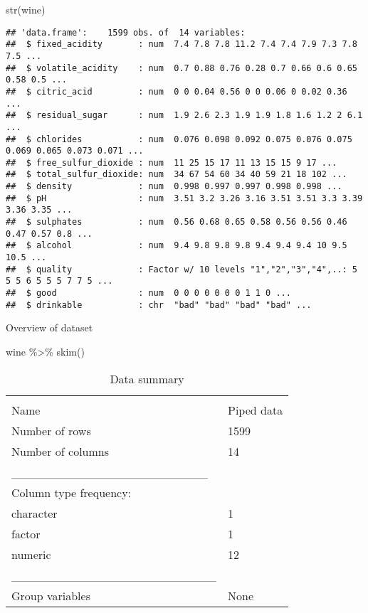 \documentclass[
]{article}
\newenvironment{Shaded}{\begin{snugshade}}{\end{snugshade}}
\newcommand{\FunctionTok}[1]{\textcolor[rgb]{0.00,0.00,0.00}{#1}}
\newcommand{\NormalTok}[1]{#1}
\newcommand{\SpecialCharTok}[1]{\textcolor[rgb]{0.00,0.00,0.00}{#1}}
\begin{document}
\begin{Shaded}
\begin{Highlighting}[]
\FunctionTok{str}\NormalTok{(wine)}
\end{Highlighting}
\end{Shaded}

\begin{verbatim}
## 'data.frame':    1599 obs. of  14 variables:
##  $ fixed_acidity       : num  7.4 7.8 7.8 11.2 7.4 7.4 7.9 7.3 7.8 7.5 ...
##  $ volatile_acidity    : num  0.7 0.88 0.76 0.28 0.7 0.66 0.6 0.65 0.58 0.5 ...
##  $ citric_acid         : num  0 0 0.04 0.56 0 0 0.06 0 0.02 0.36 ...
##  $ residual_sugar      : num  1.9 2.6 2.3 1.9 1.9 1.8 1.6 1.2 2 6.1 ...
##  $ chlorides           : num  0.076 0.098 0.092 0.075 0.076 0.075 0.069 0.065 0.073 0.071 ...
##  $ free_sulfur_dioxide : num  11 25 15 17 11 13 15 15 9 17 ...
##  $ total_sulfur_dioxide: num  34 67 54 60 34 40 59 21 18 102 ...
##  $ density             : num  0.998 0.997 0.997 0.998 0.998 ...
##  $ pH                  : num  3.51 3.2 3.26 3.16 3.51 3.51 3.3 3.39 3.36 3.35 ...
##  $ sulphates           : num  0.56 0.68 0.65 0.58 0.56 0.56 0.46 0.47 0.57 0.8 ...
##  $ alcohol             : num  9.4 9.8 9.8 9.8 9.4 9.4 9.4 10 9.5 10.5 ...
##  $ quality             : Factor w/ 10 levels "1","2","3","4",..: 5 5 5 6 5 5 5 7 7 5 ...
##  $ good                : num  0 0 0 0 0 0 0 1 1 0 ...
##  $ drinkable           : chr  "bad" "bad" "bad" "bad" ...
\end{verbatim}

Overview of dataset

\begin{Shaded}
\begin{Highlighting}[]
\NormalTok{wine }\SpecialCharTok{\%\textgreater{}\%} \FunctionTok{skim}\NormalTok{()}
\end{Highlighting}
\end{Shaded}

\begin{longtable}[]{@{}ll@{}}
\caption{Data summary}\tabularnewline
\toprule
& \\
\midrule
\endfirsthead
\toprule
& \\
\midrule
\endhead
Name & Piped data \\
Number of rows & 1599 \\
Number of columns & 14 \\
\_\_\_\_\_\_\_\_\_\_\_\_\_\_\_\_\_\_\_\_\_\_\_ & \\
Column type frequency: & \\
character & 1 \\
factor & 1 \\
numeric & 12 \\
\_\_\_\_\_\_\_\_\_\_\_\_\_\_\_\_\_\_\_\_\_\_\_\_ & \\
Group variables & None \\
\bottomrule
\end{longtable}
\end{document}
